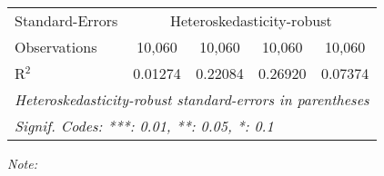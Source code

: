 \begin{table}[htbp!]
\begin{adjustbox}{width = 1\textwidth, max height = 0.95\textheight, center}
\begin{threeparttable}[b]
\begin{tabular}{lcccc}
            \midrule 
            Standard-Errors & \multicolumn{4}{c}{Heteroskedasticity-robust} \\ 
            Observations         & 10,060                          & 10,060                         & 10,060                          & 10,060\\  
            R$^2$                & 0.01274                         & 0.22084                        & 0.26920                         & 0.07374\\  
            \midrule \midrule
            \multicolumn{5}{l}{\emph{Heteroskedasticity-robust standard-errors in parentheses}}\\
            \multicolumn{5}{l}{\emph{Signif. Codes: ***: 0.01, **: 0.05, *: 0.1}}\\
         \end{tabular}
         
         \begin{tablenotes}\item \medskip \textit{Note:}
         \end{tablenotes}
      \end{threeparttable}
   \end{adjustbox}
\end{table}


